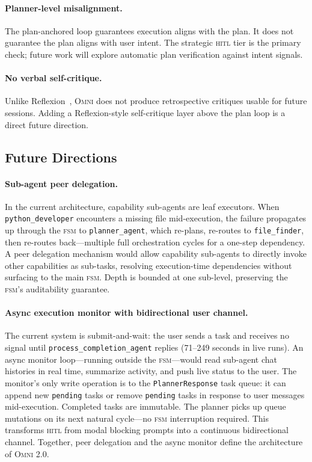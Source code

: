 \documentclass[11pt,a4paper]{article}
\newcommand{\omni}{\textsc{Omni}}
\newcommand{\hitl}{\textsc{hitl}}
\newcommand{\fsm}{\textsc{fsm}}
\begin{document}
\paragraph{Planner-level misalignment.} The plan-anchored loop guarantees execution aligns with the plan. It does not guarantee the plan aligns with user intent. The strategic \hitl{} tier is the primary check; future work will explore automatic plan verification against intent signals.

\paragraph{No verbal self-critique.} Unlike Reflexion~\cite{shinn2023reflexion}, \omni{} does not produce retrospective critiques usable for future sessions. Adding a Reflexion-style self-critique layer above the plan loop is a direct future direction.

\subsection{Future Directions}

\paragraph{Sub-agent peer delegation.} In the current architecture, capability sub-agents are leaf executors. When \texttt{python\_developer} encounters a missing file mid-execution, the failure propagates up through the \fsm{} to \texttt{planner\_agent}, which re-plans, re-routes to \texttt{file\_finder}, then re-routes back---multiple full orchestration cycles for a one-step dependency. A peer delegation mechanism would allow capability sub-agents to directly invoke other capabilities as sub-tasks, resolving execution-time dependencies without surfacing to the main \fsm{}. Depth is bounded at one sub-level, preserving the \fsm{}'s auditability guarantee.

\paragraph{Async execution monitor with bidirectional user channel.} The current system is submit-and-wait: the user sends a task and receives no signal until \texttt{process\_completion\_agent} replies (71--249 seconds in live runs). An async monitor loop---running outside the \fsm{}---would read sub-agent chat histories in real time, summarize activity, and push live status to the user. The monitor's only write operation is to the \texttt{PlannerResponse} task queue: it can append new \texttt{pending} tasks or remove \texttt{pending} tasks in response to user messages mid-execution. Completed tasks are immutable. The planner picks up queue mutations on its next natural cycle---no \fsm{} interruption required. This transforms \hitl{} from modal blocking prompts into a continuous bidirectional channel. Together, peer delegation and the async monitor define the architecture of \omni{} 2.0.
\end{document}
